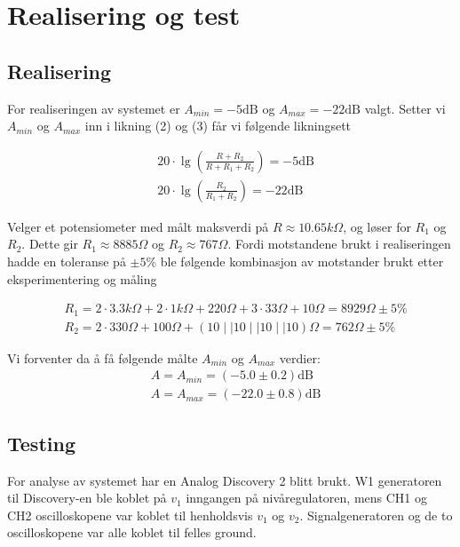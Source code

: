 \section{Realisering og test}
\label{realiseringOgTest}

\subsection{Realisering}
For realiseringen av systemet er $A_{min} = -5\text{dB}$ og $A_{max} = -22\text{dB}$ valgt.
Setter vi $A_{min}$ og $A_{max}$ inn i likning (2) og (3) får vi følgende likningsett

\begin{align}
    &20 \cdot \lg{\left(\frac{R + R_2}{R + R_1 + R_2}\right)} = -5 \text{dB} \label{eq:eq1} \tag{I} \\
    &20 \cdot \lg{\left(\frac{R_2}{R_1 + R_2}\right)} = -22 \text{dB} \label{eq:eq2} \tag{II}
\end{align}

Velger et potensiometer med målt maksverdi på $R \approx 10.65k\Omega$, og løser for $R_1$ og $R_2$.
Dette gir $R_1 \approx 8885\Omega$ og $R_2 \approx 767\Omega$. Fordi motstandene brukt i realiseringen 
hadde en toleranse på $\pm 5$\% ble følgende kombinasjon av motstander brukt etter eksperimentering og måling

\begin{align*}
    &R_1 = 2 \cdot 3.3k\Omega + 2 \cdot 1k\Omega + 220\Omega + 3 \cdot 33\Omega + 10\Omega = 8929\Omega \pm 5\% \\
    &R_2 = 2 \cdot 330\Omega + 100\Omega + \left(10 \mid\mid 10 \mid\mid 10 \mid\mid 10\right)\Omega = 762\Omega \pm 5\%
\end{align*}

Vi forventer da å få følgende målte $A_{min}$ og $A_{max}$ verdier:
\begin{align*}
    &A = A_{min} = (-5.0 \pm 0.2) \text{dB} \\
    &A = A_{max} = (-22.0 \pm 0.8) \text{dB} 
\end{align*}

\subsection{Testing}
For analyse av systemet har en Analog Discovery 2 \cite{discovery} blitt brukt. 
W1 generatoren til Discovery-en ble koblet på $v_1$ inngangen på nivåregulatoren,
mens CH1 og CH2 oscilloskopene var koblet til henholdsvis $v_1$ og $v_2$. Signalgeneratoren og 
de to oscilloskopene var alle koblet til felles ground.

